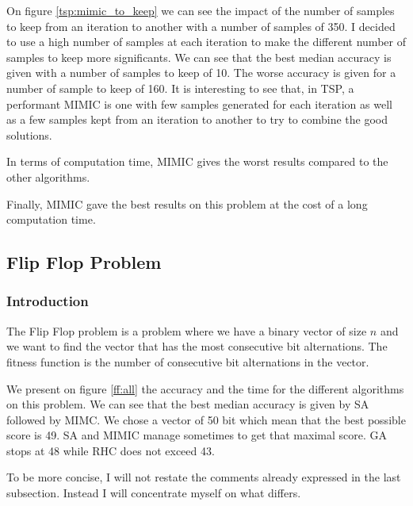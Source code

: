 \documentclass[twocolumn, 10pt]{article}
\begin{document}
				On figure \ref{tsp:mimic_to_keep} we can see the impact of the number of samples to keep from an iteration to another with a number of samples of 350. I decided to use a high number of samples at each iteration to make the different number of samples to keep more significants. We can see that the best median accuracy is given with a number of samples to keep of 10. The worse accuracy is given for a number of sample to keep of 160. It is interesting to see that, in TSP, a performant MIMIC is one with few samples generated for each iteration as well as a few samples kept from an iteration to another to try to combine the good solutions.

				In terms of computation time, MIMIC gives the worst results compared to the other algorithms.

				Finally, MIMIC gave the best results on this problem at the cost of a long computation time.
		\subsection{Flip Flop Problem}
			\subsubsection*{Introduction}
				The Flip Flop problem is a problem where we have a binary vector of size $n$ and we want to find the vector that has the most consecutive bit alternations. The fitness function is the number of consecutive bit alternations in the vector.

				We present on figure \ref{ff:all} the accuracy and the time for the different algorithms on this problem. We can see that the best median accuracy is given by SA followed by MIMC. We chose a vector of 50 bit which mean that the best possible score is 49. SA and MIMIC manage sometimes to get that maximal score. GA stops at 48 while RHC does not exceed 43.

				To be more concise, I will not restate the comments already expressed in the last subsection. Instead I will concentrate myself on what differs.
\end{document}
